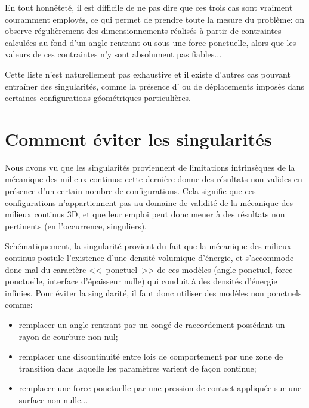 \medskip
En tout honnêteté, il est difficile de ne pas dire que ces trois cas sont vraiment couramment
employés, ce qui permet de prendre toute la mesure du problème: on observe régulièrement des
dimensionnements réalisés à partir de contraintes calculées au fond d'un angle rentrant ou sous
une force ponctuelle, alors que les valeurs de ces contraintes n'y sont absolument pas fiables...

Cette liste n'est naturellement pas exhaustive et il existe d'autres cas pouvant entraîner des
singularités, comme la présence d' ou de déplacements imposés
dans certaines configurations géométriques particulières.


\medskip
\section{Comment éviter les singularités}

Nous avons vu que les singularités proviennent de limitations intrinsèques de la mécanique des
milieux continus: cette dernière donne des résultats non valides en présence d'un certain
nombre de configurations. Cela signifie que ces configurations n'appartiennent
pas au domaine de validité de la mécanique des milieux continus 3D, et que leur emploi peut
donc mener à des résultats non pertinents (en l'occurrence, singuliers).

\medskip
Schématiquement, la singularité provient du fait que la mécanique des milieux continus postule
l'existence d'une densité volumique d'énergie, et s'accommode donc mal du caractère
<<~ponctuel~>> de ces modèles (angle ponctuel, force ponctuelle, interface d'épaisseur nulle) qui
conduit à des densités d'énergie infinies. Pour éviter la singularité, il faut donc utiliser des
modèles non ponctuels comme:
\begin{itemize}
  \item remplacer un angle rentrant par un congé de raccordement possédant un rayon de courbure
	non nul;
  \item remplacer une discontinuité entre lois de comportement par une zone de transition dans
	laquelle les paramètres varient de façon continue;
  \item remplacer une force ponctuelle par une pression de contact appliquée sur une surface non
	nulle...
\end{itemize}


